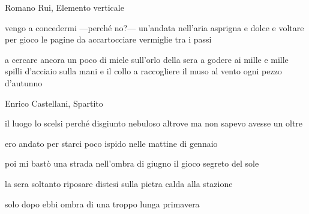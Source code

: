 
\begin{artItem}
	Romano Rui, Elemento verticale
\end{artItem}

\begin{poem}
	\begin{stanza}
		vengo a concedermi\verseline
		—perché no?—\verseline
		un'andata nell'aria asprigna\verseline
		e dolce e voltare\verseline
		per gioco le pagine\verseline
		da accartocciare vermiglie\verseline
		tra i passi
	\end{stanza}

	\begin{stanza}
		a cercare ancora un poco di miele\verseline
		sull'orlo della sera\verseline
		a godere ai mille\verseline
		e mille spilli d'acciaio\verseline
		sulla mani e il collo\verseline
		a raccogliere il muso al vento\verseline
		ogni pezzo d'autunno
	\end{stanza}
\end{poem}

\clearpage


\begin{artItem}
	Enrico Castellani, Spartito
\end{artItem}

\begin{poem}
	\begin{stanza}
		il luogo lo scelsi perché disgiunto\verseline
		nebuloso altrove\verseline
		ma non sapevo\verseline
		avesse un oltre
	\end{stanza}

	\begin{stanza}
		ero andato per starci poco\verseline
		ispido nelle mattine di gennaio
	\end{stanza}

	\begin{stanza}
		poi mi bastò una strada\verseline
		nell'ombra di giugno\verseline
		il gioco segreto del sole
	\end{stanza}

	\begin{stanza}
		la sera soltanto riposare distesi\verseline
		sulla pietra calda alla stazione
	\end{stanza}

	\begin{stanza}
		solo dopo ebbi ombra\verseline
		di una troppo lunga primavera
	\end{stanza}
\end{poem}

